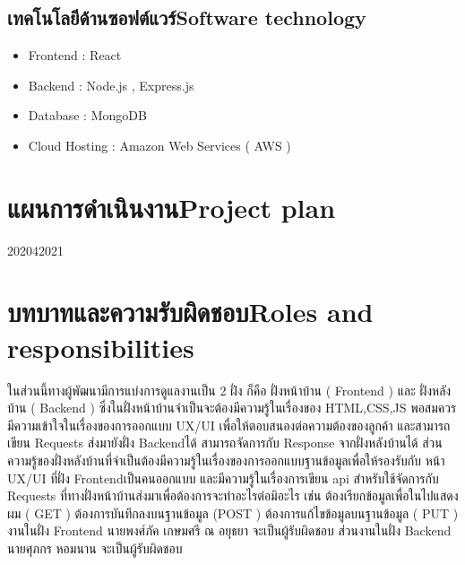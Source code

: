\subsection{\ifcpe เทคโนโลยีด้านซอฟต์แวร์\else Software technology\fi}
\begin{itemize}
    \item Frontend : React 	
    \item Backend : Node.js , Express.js 
    \item Database : MongoDB
    \item Cloud Hosting : Amazon Web Services ( AWS )
\end{itemize}



\section{\ifcpe แผนการดำเนินงาน\else Project plan\fi}

\begin{plan}{6}{2020}{4}{2021}

\end{plan}

\section{\ifcpe บทบาทและความรับผิดชอบ\else Roles and responsibilities\fi}
ในส่วนนี้ทางผู้พัฒนามีการแบ่งการดูแลงานเป็น 2 ฝั่ง ก็คือ ฝั่งหน้าบ้าน 
( Frontend ) และ ฝั่งหลังบ้าน ( Backend ) ซึ่งในฝั่งหน้าบ้านจำเป็นจะต้องมีความรู้ในเรื่องของ HTML,CSS,JS พอสมควร มีความเข้าใจในเรื่องของการออกแบบ UX/UI เพื่อให้ตอบสนองต่อความต้องของลูกค้า และสามารถเขียน Requests ส่งมายังฝั่ง Backendได้ สามารถจัดการกับ Response จากฝั่งหลังบ้านได้ ส่วนความรู้ของฝั่งหลังบ้านที่จำเป็นต้องมีความรู้ในเรื่องของการออกแบบฐานข้อมูลเพื่อให้รองรับกับ หน้า UX/UI ที่ฝั่ง Frontendเป็นคนออกแบบ และมีความรู้ในเรื่องการเขียน api สำหรับใช้จัดการกับ Requests ที่ทางฝั่งหน้าบ้านส่งมาเพื่อต้องการจะทำอะไรต่อมิอะไร เช่น ต้องเรียกข้อมูลเพื่อในไปแสดงผม ( GET )
ต้องการบันทึกลงบนฐานข้อมูล (POST ) ต้องการแก้ไขข้อมูลบนฐานข้อมูล ( PUT )
งานในฝั่ง Frontend นายพงศ์ภัค เกษมศรี ณ อยุธยา จะเป็นผู้รับผิดชอบ 
ส่วนงานในฝั่ง Backend นายศุภกร หอมนาน  จะเป็นผู้รับผิดชอบ


